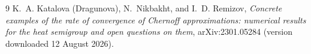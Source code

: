 \documentclass[11pt,a4paper]{article}
\begin{document}
\begin{thebibliography}{9}
K.~A. Katalova (Dragunova), N.~Nikbakht, and I.~D. Remizov,
\emph{Concrete examples of the rate of convergence of Chernoff
approximations: numerical results for the heat semigroup and open questions
on them}, arXiv:2301.05284 (version downloaded 12 August 2026).
\end{thebibliography}
\end{document}
